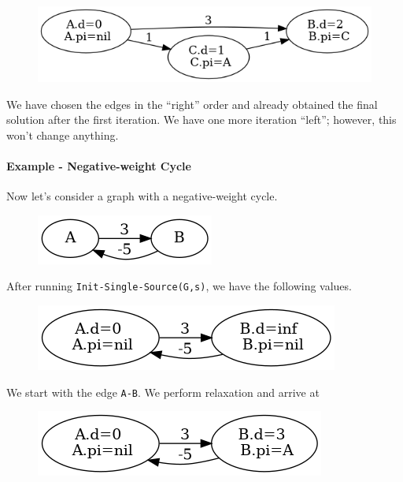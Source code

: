 \begin{figure}[H]
\centering
\includegraphics[scale=0.5]{images/sssp_9.png}
\end{figure}

We have chosen the edges in the ``right'' order and already obtained the final solution after the first iteration. We have one more iteration ``left''; however, this won't change anything.

\paragraph{Example - Negative-weight Cycle} Now let's consider a graph with a negative-weight cycle. 

\begin{figure}[H]
\centering
\includegraphics[scale=0.5]{images/sssp_15.png}
\end{figure}

After running \verb|Init-Single-Source(G,s)|, we have the following values.

\begin{figure}[H]
\centering
\includegraphics[scale=0.5]{images/sssp_16.png}
\end{figure}

We start with the edge \verb|A-B|. We perform relaxation and arrive at

\begin{figure}[H]
\centering
\includegraphics[scale=0.5]{images/sssp_17.png}
\end{figure}

